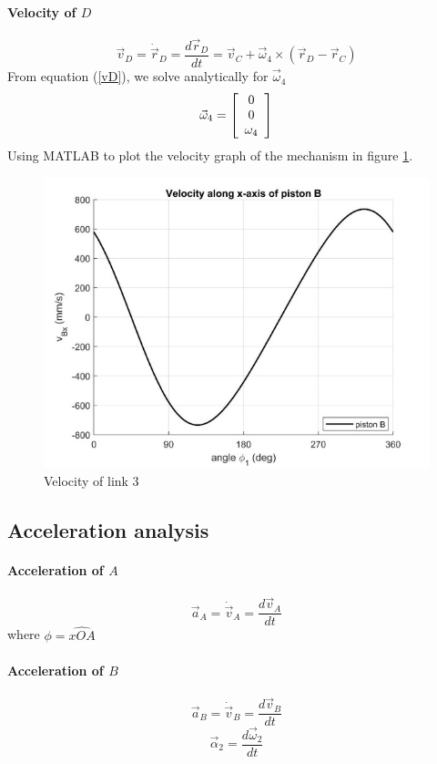 \paragraph{Velocity of $ D $}
\begin{equation}\label{vD}
\vec{v}_D=\dot{\vec{r}}_D=\dfrac{d\vec{r}_D}{dt}=\vec{v}_C+\vec{\omega}_4\times(\vec{r}_D-\vec{r}_C)
\end{equation}
From equation (\ref{vD}), we solve analytically for $ \vec{\omega}_4 $
\[\vec{\omega}_4=\left[ \begin{array}{c} 0\\ 0\\ \omega_4 \end{array} \right]\]
Using MATLAB\textup{\textregistered} to plot the velocity graph of the mechanism in figure \ref{fig:06}.
\begin{figure}[ht]
	\centering
	\includegraphics{06}
	\caption{Velocity of link 3}
	\label{fig:06}
\end{figure}
\subsection{Acceleration analysis}
\paragraph{Acceleration of $ A $}
\begin{equation}\label{aA}
\vec{a}_A=\dot{\vec{v}}_A=\dfrac{d\vec{v}_A}{dt}
\end{equation}
where $ \phi=\widehat{xOA} $
\paragraph{Acceleration of $ B $}
\begin{equation}\label{aB}
\vec{a}_B=\dot{\vec{v}}_B=\dfrac{d\vec{v}_B}{dt}
\end{equation}
\[\vec{\alpha}_2=\dfrac{d\vec{\omega}_2}{dt}\]
